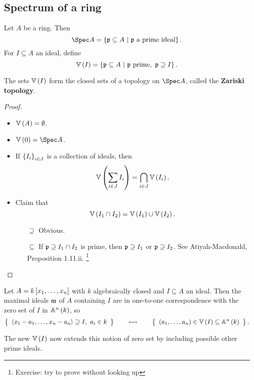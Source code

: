 \subsection{Spectrum of a ring}

\begin{definition*}
Let $ A $ be a ring. Then
$$ \Spec A = \cbr{\ppp \subseteq A \st \ppp \ \text{a prime ideal}}. $$
For $ I \subseteq A $ an ideal, define
$$ \VV\br{I} = \cbr{\ppp \subseteq A \st \ppp \ \text{prime}, \ \ppp \supseteq I}. $$
\end{definition*}

\begin{proposition}
The sets $ \VV\br{I} $ form the closed sets of a topology on $ \Spec A $, called the \textbf{Zariski topology}.
\end{proposition}

\begin{proof}
\hfill
\begin{itemize}
\item $ \VV\br{A} = \emptyset $.
\item $ \VV\br{0} = \Spec A $.
\item If $ \cbr{I_i}_{i \in J} $ is a collection of ideals, then
$$ \VV\br{\sum_{i \in J} I_i} = \bigcap_{i \in J} \VV\br{I_i}. $$
\item Claim that
$$ \VV\br{I_1 \cap I_2} = \VV\br{I_1} \cup \VV\br{I_2}. $$
\begin{itemize}
\item[$ \supseteq $] Obvious.
\item[$ \subseteq $] If $ \mathfrak{p} \supseteq I_1 \cap I_2 $ is prime, then $ \mathfrak{p} \supseteq I_1 $ or $ \mathfrak{p} \supseteq I_2 $. See Atiyah-Macdonald, Proposition 1.11.ii. \footnote{Exercise: try to prove without looking up}
\end{itemize}
\end{itemize}
\end{proof}

\begin{example*}
Let $ A = k\sbr{x_1, \dots, x_n} $ with $ k $ algebraically closed and $ I \subseteq A $ an ideal. Then the maximal ideals $ \mathfrak{m} $ of $ A $ containing $ I $ are in one-to-one correspondence with the zero set of $ I $ in $ \AA^n\br{k} $, so
$$ \correspondence{\abr{x_1 - a_1, \dots, x_n - a_n} \supseteq I, \ a_i \in k}{\br{a_1, \dots, a_n} \in \VV\br{I} \subseteq \AA^n\br{k}}. $$
\end{example*}

The new $ \VV\br{I} $ now extends this notion of zero set by including possible other prime ideals.

